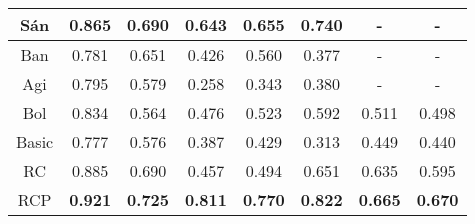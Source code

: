 \begin{table*}[th]
{\begin{tabular}{|c|c|c|c|c||c|c|c|}
S\'{a}n&0.865	&0.690	&0.643&0.655&0.740	&-&-\\ \hline %
Ban&0.781	&0.651&0.426&0.560&0.377	 &-&-\\ \hline %
Agi&0.795	&0.579&0.258&0.343&0.380	 &-&-\\ \hline %
Bol&0.834	&0.564& 0.476&0.523&0.592 &0.511&0.498\\ \hline %
Basic&0.777	&0.576 &0.387&0.429&0.313	 &0.449&0.440\\ \hline %
RC	&0.885	&0.690 &0.457&0.494&0.651	 &0.635&0.595\\ \hline %
RCP&\textbf{0.921}&\textbf{0.725} &\textbf{0.811}&\textbf{0.770}&\textbf{0.822} &\textbf{0.665}&\textbf{0.670}\\ \hline %
\end{tabular}
}
\end{table*}

